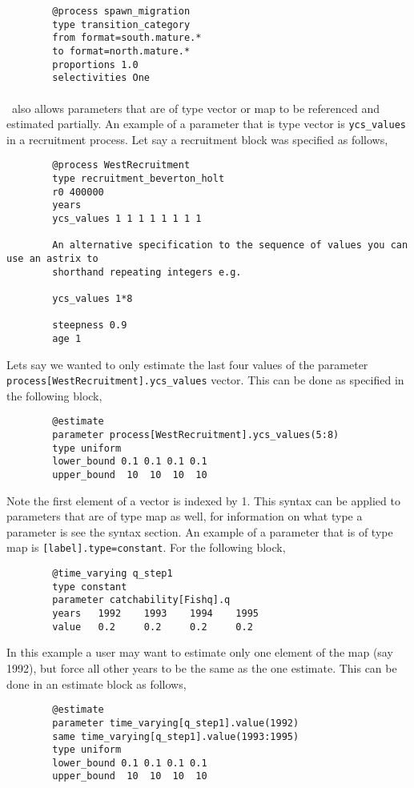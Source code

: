 {\small{\begin{verbatim}
		@process spawn_migration
		type transition_category 		
		from format=south.mature.*	
		to format=north.mature.*
		proportions 1.0
		selectivities One
		\end{verbatim}}}


\paragraph*{\label{sec:params}}
\CNAME\ also allows parameters that are of type vector or map to be referenced and estimated partially. An example of a parameter that is type vector is \texttt{ycs\_values} in a recruitment process. Let say a recruitment block was specified as follows,
{\small{\begin{verbatim}
		@process WestRecruitment
		type recruitment_beverton_holt
		r0 400000
		years
		ycs_values 1 1 1 1 1 1 1 1 
		
		An alternative specification to the sequence of values you can use an astrix to
		shorthand repeating integers e.g.
		
		ycs_values 1*8
		
		steepness 0.9
		age 1
		\end{verbatim}}}

Lets say we wanted to only estimate the last four values of the parameter \texttt{process[WestRecruitment].ycs\_values} vector. This can be done as specified in the following  block,

{\small{\begin{verbatim}
		@estimate
		parameter process[WestRecruitment].ycs_values(5:8)
		type uniform
		lower_bound 0.1 0.1 0.1 0.1
		upper_bound  10  10  10  10 
		\end{verbatim}}}

Note the first element of a vector is indexed by 1. This syntax can be applied to parameters that are of type map as well, for information on what type a parameter is see the syntax section. An example of a parameter that is of type map is \texttt{[label].type=constant}. For the following  block,

{\small{\begin{verbatim}
		@time_varying q_step1
		type constant
		parameter catchability[Fishq].q
		years 	1992	1993	1994	1995
		value 	0.2		0.2		0.2		0.2	
		\end{verbatim}}}

In this example a user may want to estimate only one element of the map (say 1992), but force all other years to be the same as the one estimate. This can be done in an estimate block as follows,
{\small{\begin{verbatim}
		@estimate
		parameter time_varying[q_step1].value(1992)
		same time_varying[q_step1].value(1993:1995)
		type uniform
		lower_bound 0.1 0.1 0.1 0.1
		upper_bound  10  10  10  10 
		\end{verbatim}}}
